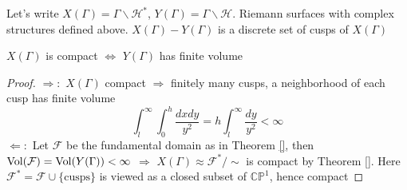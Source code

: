 \documentclass[main]{subfiles}
\begin{document}
Let's write $X(\Gamma)=\Gamma\backslash\mathcal H^*$, $Y(\Gamma)=\Gamma\backslash\mathcal H$. Riemann surfaces with complex structures defined above. $X(\Gamma)-Y(\Gamma)$ is a discrete set of cusps of $X(\Gamma)$

\begin{theorem}[Siegel]
$X(\Gamma)$ is compact $\iff$ $Y(\Gamma)$ has finite volume
\end{theorem}

\begin{proof}
$\Rightarrow:$ $X(\Gamma)$ compact $\Rightarrow$ finitely many cusps, a neighborhood of each cusp has finite volume
\[\int_l^\infty\int_0^h\frac{dxdy}{y^2}=h\int_l^\infty\frac{dy}{y^2}<\infty\]
$\Leftarrow:$ Let $\mathcal F$ be the fundamental domain as in Theorem \ref{}, then $\operatorname{Vol}(\mathcal F)=\operatorname{Vol}(Y(\Gamma))<\infty$ $\Rightarrow$ $X(\Gamma)\approx \mathcal F^*/\sim$ is compact by Theorem \ref{}. Here $\mathcal F^*=\mathcal F\cup\{\text{cusps}\}$ is viewed as a closed subset of $\mathbb{CP}^1$, hence compact
\end{proof}
\end{document}
